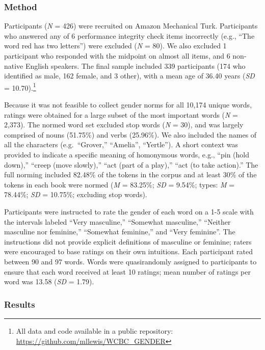 \documentclass[
  english,
  ,man,floatsintext]{apa6}
\begin{document}
\hypertarget{method-1}{%
\subsubsection{Method}\label{method-1}}

Participants (\emph{N} = 426) were recruited on Amazon Mechanical Turk. Participants who answered any of 6 performance integrity check items incorrectly (e.g., \enquote{The word red has two letters}) were excluded (\emph{N} = 80). We also excluded 1 participant who responded with the midpoint on almost all items, and 6 non-native English speakers. The final sample included 339 participants (174 who identified as male, 162 female, and 3 other), with a mean age of 36.40 years (\emph{SD} = 10.70).\footnote{All data and code available in a public repository: \url{https://github.com/mllewis/WCBC_GENDER}}

Because it was not feasible to collect gender norms for all 10,174 unique words, ratings were obtained for a large subset of the most important words (\emph{N} = 2,373). The normed word set excluded stop words (\emph{N} = 30), and was largely comprised of nouns (51.75\%) and verbs (25.96\%). We also included the names of all the characters (e.g.~\enquote{Grover,} \enquote{Amelia}, \enquote{Yertle}). A short context was provided to indicate a specific meaning of homonymous words, e.g., \enquote{pin (hold down),} \enquote{creep (move slowly),} \enquote{act (part of a play),} \enquote{act (to take action).} The full norming included 82.48\% of the tokens in the corpus and at least 30\% of the tokens in each book were normed (\emph{M} = 83.25\%; \emph{SD} = 9.54\%; types: \emph{M} = 78.44\%; \emph{SD} = 10.75\%; excluding stop words).

Participants were instructed to rate the gender of each word on a 1-5 scale with the intervals labeled \enquote{Very masculine,} \enquote{Somewhat masculine,} \enquote{Neither masculine nor feminine,} \enquote{Somewhat feminine,} and \enquote{Very feminine}. The instructions did not provide explicit definitions of masculine or feminine; raters were encouraged to base ratings on their own intuitions. Each participant rated between 90 and 97 words. Words were quasirandomly assigned to participants to ensure that each word received at least 10 ratings; mean number of ratings per word was 13.58 (\emph{SD} = 1.79).

\hypertarget{results}{%
\subsubsection{Results}\label{results}}
\end{document}
